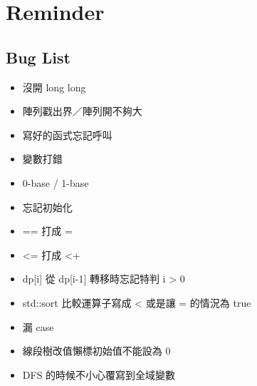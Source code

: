 \documentclass[a4paper,10pt,twocolumn,oneside]{article}
\begin{document}
\renewcommand{\headrulewidth}{0.4pt}
\renewcommand{\contentsname}{Contents} 

\pagestyle{fancy}
\fancyfoot{}
\fancyhead[R]{\thepage}


{\scriptsize
\tableofcontents}

\section{Reminder}
\subsection{Bug List}
\begin{itemize}[nolistsep]
\item 沒開 long long
\item 陣列戳出界／陣列開不夠大
\item 寫好的函式忘記呼叫
\item 變數打錯
\item 0-base / 1-base
\item 忘記初始化
\item == 打成 =
\item <= 打成 <+
\item dp[i] 從 dp[i-1] 轉移時忘記特判 i > 0
\item std::sort 比較運算子寫成 < 或是讓 = 的情況為 true
\item 漏 case
\item 線段樹改值懶標初始值不能設為 0
\item DFS 的時候不小心覆寫到全域變數
\end{itemize}

\end{document}

